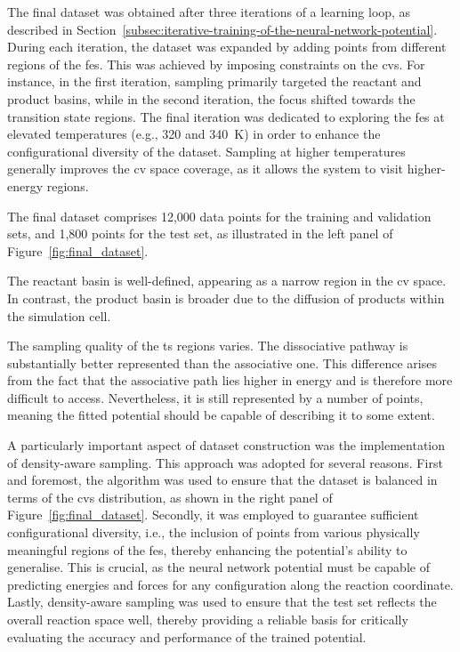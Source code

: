The final dataset was obtained after three iterations of a learning loop, as described in Section~\ref{subsec:iterative-training-of-the-neural-network-potential}. During each iteration, the dataset was expanded by adding points from different regions of the \ac{fes}. This was achieved by imposing constraints on the \acp{cv}. For instance, in the first iteration, sampling primarily targeted the reactant and product basins, while in the second iteration, the focus shifted towards the transition state regions. The final iteration was dedicated to exploring the \ac{fes} at elevated temperatures (e.g., 320 and 340~K) in order to enhance the configurational diversity of the dataset. Sampling at higher temperatures generally improves the \ac{cv} space coverage, as it allows the system to visit higher-energy regions.

The final dataset comprises 12,000 data points for the training and validation sets, and 1,800 points for the test set, as illustrated in the left panel of Figure~\ref{fig:final_dataset}.

The reactant basin is well-defined, appearing as a narrow region in the \ac{cv} space. In contrast, the product basin is broader due to the diffusion of products within the simulation cell.

The sampling quality of the \ac{ts} regions varies. The dissociative pathway is substantially better represented than the associative one. This difference arises from the fact that the associative path lies higher in energy and is therefore more difficult to access. Nevertheless, it is still represented by a number of points, meaning the fitted potential should be capable of describing it to some extent.

A particularly important aspect of dataset construction was the implementation of density-aware sampling. This approach was adopted for several reasons. First and foremost, the algorithm was used to ensure that the dataset is balanced in terms of the \acp{cv} distribution, as shown in the right panel of Figure~\ref{fig:final_dataset}. Secondly, it was employed to guarantee sufficient configurational diversity, i.e., the inclusion of points from various physically meaningful regions of the \ac{fes}, thereby enhancing the potential's ability to generalise. This is crucial, as the neural network potential must be capable of predicting energies and forces for any configuration along the reaction coordinate. Lastly, density-aware sampling was used to ensure that the test set reflects the overall reaction space well, thereby providing a reliable basis for critically evaluating the accuracy and performance of the trained potential.



